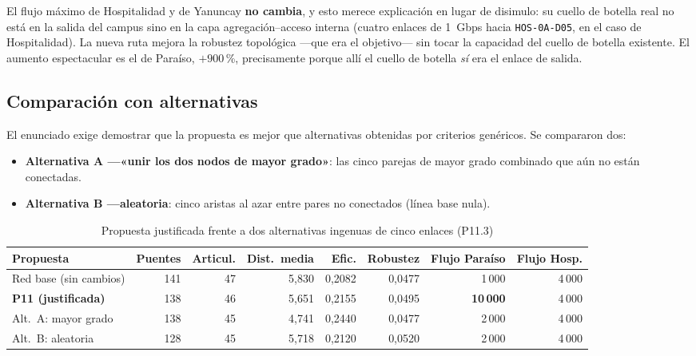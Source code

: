 \documentclass[10pt,a4paper]{extarticle}
\newcommand{\code}[1]{\texttt{\small #1}}
\begin{document}
El flujo máximo de Hospitalidad y de Yanuncay \textbf{no cambia}, y esto merece explicación
en lugar de disimulo: su cuello de botella real no está en la salida del campus sino en la
capa agregación--acceso interna (cuatro enlaces de 1~Gbps hacia \code{HOS-0A-D05}, en el caso
de Hospitalidad). La nueva ruta mejora la robustez topológica ---que era el objetivo--- sin
tocar la capacidad del cuello de botella existente. El aumento espectacular es el de Paraíso,
$+900$\,\%, precisamente porque allí el cuello de botella \textit{sí} era el enlace de
salida.

\subsection{Comparación con alternativas}

El enunciado exige demostrar que la propuesta es mejor que alternativas obtenidas por
criterios genéricos. Se compararon dos:

\begin{itemize}[leftmargin=*,itemsep=1mm]
\item \textbf{Alternativa A ---«unir los dos nodos de mayor grado»}: las cinco parejas de
mayor grado combinado que aún no están conectadas.
\item \textbf{Alternativa B ---aleatoria}: cinco aristas al azar entre pares no conectados
(línea base nula).
\end{itemize}

\begin{table}[H]
\centering
\caption{Propuesta justificada frente a dos alternativas ingenuas de cinco enlaces (P11.3)}
\label{tab:alternativas}
\small
\begin{adjustbox}{max width=\textwidth}
\begin{tabular}{lrrrrrrr}
\toprule
\textbf{Propuesta} & \textbf{Puentes} & \textbf{Articul.} & \textbf{Dist.\ media} & \textbf{Efic.} & \textbf{Robustez} & \textbf{Flujo Paraíso} & \textbf{Flujo Hosp.} \\
\midrule
Red base (sin cambios)          & 141 & 47 & 5,830 & 0,2082 & 0,0477 & 1\,000 & 4\,000 \\
\textbf{P11 (justificada)}      & 138 & 46 & 5,651 & 0,2155 & 0,0495 & \textbf{10\,000} & 4\,000 \\
Alt.\ A: mayor grado            & 138 & 45 & 4,741 & 0,2440 & 0,0477 & 2\,000 & 4\,000 \\
Alt.\ B: aleatoria              & 128 & 45 & 5,718 & 0,2120 & 0,0520 & 2\,000 & 4\,000 \\
\bottomrule
\end{tabular}
\end{adjustbox}
\end{table}
\end{document}

